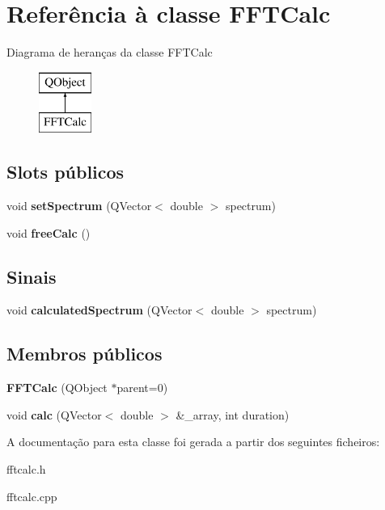 \hypertarget{class_f_f_t_calc}{\section{Referência à classe F\-F\-T\-Calc}
\label{class_f_f_t_calc}
}
Diagrama de heranças da classe F\-F\-T\-Calc\begin{figure}[H]
\begin{center}
\leavevmode
\includegraphics[height=2.000000cm]{class_f_f_t_calc}
\end{center}
\end{figure}
\subsection*{Slots públicos}
\begin{DoxyCompactItemize}
\item 
\hypertarget{class_f_f_t_calc_a630f0941389aa764c341c15a50d6c51a}{void {\bfseries set\-Spectrum} (Q\-Vector$<$ double $>$ spectrum)}\label{class_f_f_t_calc_a630f0941389aa764c341c15a50d6c51a}

\item 
\hypertarget{class_f_f_t_calc_ae12ef5c098a2bb3070a743927ef50da7}{void {\bfseries free\-Calc} ()}\label{class_f_f_t_calc_ae12ef5c098a2bb3070a743927ef50da7}

\end{DoxyCompactItemize}
\subsection*{Sinais}
\begin{DoxyCompactItemize}
\item 
\hypertarget{class_f_f_t_calc_a2c21488cc4fa4985f9152156137db30e}{void {\bfseries calculated\-Spectrum} (Q\-Vector$<$ double $>$ spectrum)}\label{class_f_f_t_calc_a2c21488cc4fa4985f9152156137db30e}

\end{DoxyCompactItemize}
\subsection*{Membros públicos}
\begin{DoxyCompactItemize}
\item 
\hypertarget{class_f_f_t_calc_ae6b220dd66a6df99041680e55746c79e}{{\bfseries F\-F\-T\-Calc} (Q\-Object $\ast$parent=0)}\label{class_f_f_t_calc_ae6b220dd66a6df99041680e55746c79e}

\item 
\hypertarget{class_f_f_t_calc_a19ee0f470123aaff939fc6c1ee833080}{void {\bfseries calc} (Q\-Vector$<$ double $>$ \&\-\_\-array, int duration)}\label{class_f_f_t_calc_a19ee0f470123aaff939fc6c1ee833080}

\end{DoxyCompactItemize}


A documentação para esta classe foi gerada a partir dos seguintes ficheiros\-:\begin{DoxyCompactItemize}
\item 
fftcalc.\-h\item 
fftcalc.\-cpp\end{DoxyCompactItemize}
